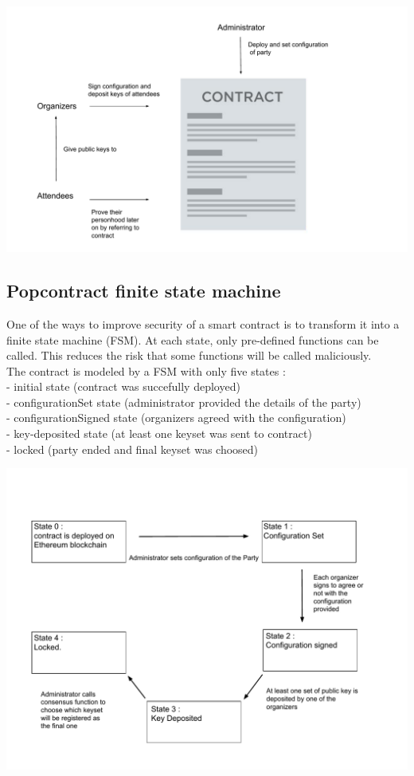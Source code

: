 \documentclass[11pt, a4paper, twoside, openright]{article} %
\begin{document}
\begin{minipage}{1\linewidth}
 \includegraphics[scale = 0.67]{popcontract.pdf}
\end{minipage}%

\subsection{Popcontract finite state machine}
One of the ways to improve security of a smart contract is to transform it into a finite state machine (FSM). At each state, only pre-defined functions can be called. This reduces the risk that some functions will be called maliciously.\\ The contract is modeled by a FSM with only five states : \\- initial state (contract was succefully deployed)\\ - configurationSet state (administrator provided the details of the party) \\ - configurationSigned state (organizers agreed with the configuration) \\ - key-deposited state (at least one keyset was sent to contract)\\ - locked (party ended and final keyset was choosed)

\begin{minipage}{1\linewidth}
 \includegraphics[scale = 0.67]{fsm.pdf}
\end{minipage}%
\end{document}
